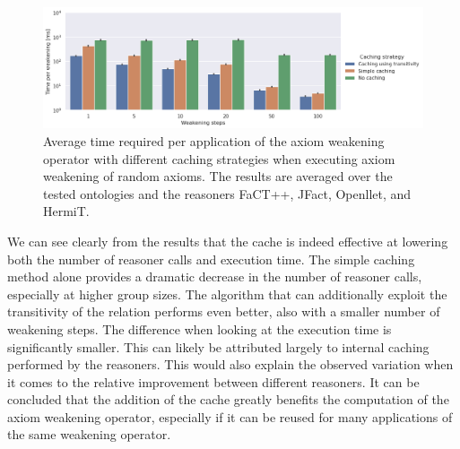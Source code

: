 \begin{figure}[ht]
  \centering
  \includegraphics[width=\textwidth]{resources/time-cache-bar.png}
  \caption{Average time required per application of the axiom weakening operator with different caching strategies when executing axiom weakening of random axioms. The results are averaged over the tested ontologies and the reasoners FaCT++, JFact, Openllet, and HermiT.}
  \label{fig:results-cache-time}
\end{figure}

We can see clearly from the results that the cache is indeed effective at lowering both the number of reasoner calls and execution time. The simple caching method alone provides a dramatic decrease in the number of reasoner calls, especially at higher group sizes. The algorithm that can additionally exploit the transitivity of the relation performs even better, also with a smaller number of weakening steps. The difference when looking at the execution time is significantly smaller. This can likely be attributed largely to internal caching performed by the reasoners. This would also explain the observed variation when it comes to the relative improvement between different reasoners. It can be concluded that the addition of the cache greatly benefits the computation of the axiom weakening operator, especially if it can be reused for many applications of the same weakening operator.

